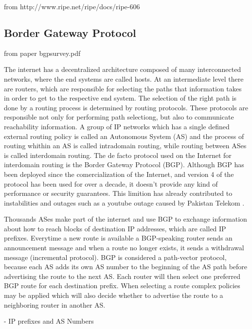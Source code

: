 \documentclass[11pt]{report}
\begin{document}
   
from http://www.ripe.net/ripe/docs/ripe-606

\subsection{Border Gateway Protocol}

from paper bgpsurvey.pdf

The internet has a decentralized architecture composed of many interconnected networks, where the end systems are called hosts. At an intermediate level there are routers, which are responsible for selecting the paths that information takes in order to get to the respective end system. The selection of the right path is done by a routing process is determined by routing protocols. These protocols are responsible not only for performing path selectiong, but also to communicate reachability information. A group of IP networks which has a single defined external routing policy is called an Autonomous System (AS) and the process of routing whithin an AS is called intradomain routing, while routing between ASes is called interdomain routing. The de facto protocol used on the Internet for interdomain routing is the Border Gateway Protocol (BGP).
Although BGP has been deployed since the comercialization of the Internet, and version 4 of the protocol has been used for over a decade, it doesn't provide any kind of performance or security guarantees. This limition has already contributed to instabilities and outages \cite{Misdirection} such as a youtube outage caused by Pakistan Telekom \cite{Pakistan}. 

	Thousands ASes make part of the internet and use BGP to exchange information about how to reach blocks of destination IP addresses, which are called IP prefixes. Everytime a new route is available a BGP-speaking router sends an announcement message and when a route no longer exists, it sends a withdrawal message (incremental protocol). BGP is considered a path-vector protocol, because each AS adds its own AS number to the beginning of the AS path before advertising the route to the next AS. Each router will then select one preferred BGP route for each destination prefix. When selecting a route complex policies may be applied which will also decide whether to advertise the route to a neighboring router in another AS.   

	- IP prefixes and AS Numbers
	
\end{document}
